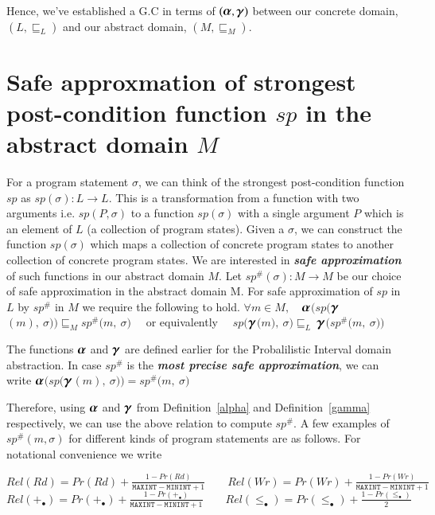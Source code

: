 \documentclass[final,3p, review, times]{Elsevier/elsarticle}
\newcommand{\ALPHA}{\large\boldsymbol{\alpha}\normalsize}
\newcommand{\GAMMA}{\large\boldsymbol{\gamma}\normalsize}
\begin{document}
Hence, we've established a G.C in terms of $\big(\ALPHA,\GAMMA\big)$ between our concrete domain, $(L,\sqsubseteq_L)$ and our abstract domain, $(M,\sqsubseteq_M)$.

\section{Safe approxmation of strongest post-condition function $sp$ in the abstract domain $M$}

For a program statement $\sigma$, we can think of the strongest post-condition function $sp$ as $sp(\sigma) : L\to L$. This is a transformation from a function with two arguments i.e. $sp(P,\sigma)$ to a function $sp(\sigma)$ with a single argument $P$ which is an element of $L$ (a collection of program states). Given a $\sigma$, we can construct the function $sp(\sigma)$ which maps a collection of concrete program states to another collection of concrete program states. We are interested in \textbf{\textit{safe approximation}} of such functions in our abstract domain $M$. Let $sp^\#(\sigma) : M\to M$ be our choice of safe approximation in the abstract domain M. For safe approximation of $sp$ in $L$ by $sp^\#$ in $M$ we require the following to hold.
$\forall m\in M,\quad$$\ALPHA$$\Big(sp\big($$\GAMMA$$(m),\ \sigma\big)\Big)\sqsubseteq_M sp^\#\big(m,\ \sigma\big)\quad$ or equivalently $\quad sp\Big($$\GAMMA$$\big(m\big),\ \sigma\Big)\sqsubseteq_L\ $$\GAMMA$$\Big(sp^\#\big(m,\ \sigma\big)\Big)$

The functions $\ALPHA$ and $\GAMMA$ are defined earlier for the Probalilistic Interval domain abstraction. In case $sp^\#$ is the \textbf{\textit{most precise safe approximation}}, we can write
$\ALPHA$$\Big(sp\big($$\GAMMA$$(m),\ \sigma\big)\Big)=sp^\#\big(m,\ \sigma\big)$

Therefore, using $\ALPHA$ and $\GAMMA$ from Definition~\ref{alpha} and Definition~\ref{gamma} respectively, we can use the above relation to compute $sp^\#$. A few examples of $sp^\#(m,\sigma)$ for different kinds of program statements are as follows. For notational convenience we write

$\displaystyle Rel(Rd)=Pr(Rd) + \frac{1-Pr(Rd)}{\mathtt{MAXINT}-\mathtt{MININT}+1}\qquad Rel(Wr)=Pr(Wr) + \frac{1-Pr(Wr)}{\mathtt{MAXINT}-\mathtt{MININT}+1}$\\

$\displaystyle Rel(+_{\bullet})=Pr(+_{\bullet}) + \frac{1-Pr(+_{\bullet})}{\mathtt{MAXINT}-\mathtt{MININT}+1}\qquad Rel(\leq_{\bullet})=Pr(\leq_{\bullet}) + \frac{1-Pr(\leq_{\bullet})}{2}$\\
\end{document}

